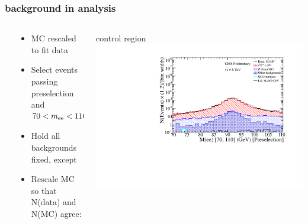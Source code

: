 \documentclass[bigger]{beamer}
\begin{document}
\begin{frame}
\frametitle{\zjets background in \eejj analysis}
\label{sec-2-2-6}
\begin{columns} %
\label{sec-2-2-6-1}
\begin{column}{0.6\textwidth}
\label{sec-2-2-6-1-1}

\begin{itemize}
\item \zjets MC rescaled to fit data
\item Select events passing \eejj preselection and $70 < m_{\text{ee}} < 110$
\item Hold all backgrounds fixed, except \zjets
\item Rescale \zjets MC so that N(data) and N(MC) agree:
\end{itemize}
\end{column}
\begin{column}{0.6\textwidth}
\label{sec-2-2-6-1-2}

\centering
\zjets control region
\includegraphics[width=\textwidth]{fig/ee/preselection_noRatio/Mee_70_110_Preselection_eejj.pdf}
\end{column}
\end{columns}
\label{sec-2-2-6-2}

\end{frame}
\end{document}
